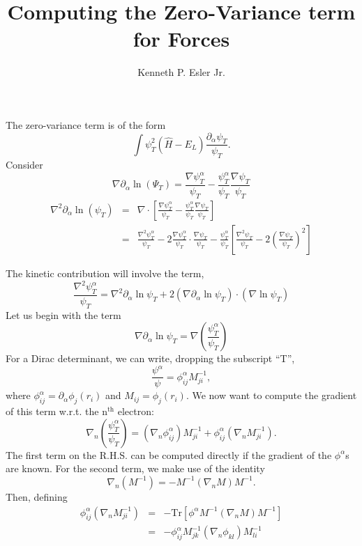 \documentclass{article}
\author{Kenneth P. Esler Jr.}
\title{Computing the Zero-Variance term for Forces}
\begin{document}
\maketitle
The zero-variance term is of the form
\begin{equation}
\int \psi_T^2 (\hat{H} - E_L) \frac{\partial_\alpha \psi_T}{\psi_T}.
\end{equation}
Consider
\begin{equation}
\nabla \partial_\alpha \ln(\Psi_T) = \frac{\nabla \psi^\alpha_T}{\psi_T} - \frac{\psi^\alpha_T}{\psi_T} \frac{\nabla \psi_T}{\psi_T} 
\end{equation}
\begin{eqnarray}
\nabla^2\partial_\alpha \ln(\psi_T) & = & \nabla\cdot \left[
\frac{\nabla \psi^\alpha_T}{\psi_T} - \frac{\psi^\alpha_T}{\psi_T} \frac{\nabla \psi_T}{\psi_T} \right] \\
& = & \frac{\nabla^2 \psi^\alpha_T}{\psi_T} - 2\frac{\nabla \psi^{\alpha}_T}{\psi_T} \cdot \frac{\nabla \psi_T}{\psi_T} - \frac{\psi^\alpha_T}{\psi_T} \left[\frac{\nabla^2\psi_T}{\psi_T} - 2\left(\frac{\nabla\psi_T}{\psi_T}\right)^2\right]
\end{eqnarray}


The kinetic contribution will involve the term,
\begin{equation}
\frac{\nabla^2 \psi_T^\alpha}{\psi_T} = \nabla^2 \partial_\alpha \ln
\psi_T + 2 (\nabla \partial_\alpha \ln \psi_T)\cdot (\nabla \ln \psi_T)
\end{equation}
Let us begin with the term
\begin{equation}
\nabla \partial_\alpha \ln \psi_T =
\nabla\left(\frac{\psi^\alpha_T}{\psi_T}\right)
\end{equation}
For a Dirac determinant, we can write, dropping the subscript ``T'', 
\begin{equation}
\frac{\psi^\alpha}{\psi} = \phi^\alpha_{ij} M^{-1}_{ji},
\end{equation}
where $\phi^{\alpha}_{ij} = \partial_\alpha \phi_j(r_i)$ and $M_{ij} =
\phi_j(r_i)$.  We now want to compute the gradient of this term
w.r.t. the n$^\text{th}$ electron:
\begin{equation}
\nabla_n \left(\frac{\psi^\alpha_T}{\psi_T}\right)  = 
(\nabla_n \phi_{ij}^\alpha)M^{-1}_{ji} + \phi^\alpha_{ij} (\nabla_n M^{-1}_{ji}).
\end{equation}
The first term on the R.H.S. can be computed directly if the gradient
of the $\phi^\alpha$s are known.  For the second term, we make use of
the identity 
\begin{equation}
\nabla_n (M^{-1}) = -M^{-1} (\nabla_n M) M^{-1}.
\end{equation}
Then, defining 
\begin{eqnarray}
\phi^\alpha_{ij} (\nabla_n M^{-1}_{ji}) & = & -\text{Tr}\left[\phi^\alpha M^{-1}
  (\nabla_n M)M^{-1}\right] \\
& = & -\phi^\alpha_{ij} M^{-1}_{jk} (\nabla_n \phi_{kl}) M^{-1}_{li}
\end{eqnarray}
\end{document}
